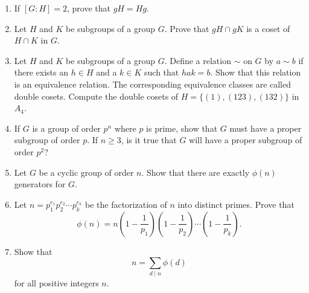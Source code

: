 {\begin{enumerate}
\item
If $[G : H] = 2$, prove that $gH = Hg$.

\item
Let $H$ and $K$ be subgroups of a group $G$.  Prove that $gH \cap gK$ is a coset of $H \cap K$ in $G$.  
 
\item
Let $H$ and $K$ be subgroups of a group $G$.  Define a relation $\sim$ on $G$ by $a \sim b$ if there exists an $h \in H$ and a $k \in K$ such that $hak = b$.  Show that this relation is an equivalence relation.  The corresponding equivalence classes are called {\bfi double cosets}.  Compute the double cosets of $H = \{ (1),(123), (132) \}$ in~$A_4$. 
 
\item
If $G$ is a group of order $p^n$ where $p$ is prime, show that $G$ must have a proper subgroup of order $p$.  If $n \geq 3$, is it true that $G$ will have a proper subgroup of order $p^2$?
 
\item
Let $G$ be a cyclic group of order $n$.  Show that there are exactly $\phi(n)$ generators for $G$.

\item
Let $n = p_1^{e_1} p_2^{e_2} \cdots p_k^{e_k}$ be the factorization of $n$ into distinct primes.  Prove that
$$
\phi(n) =  n 
\left( 1- \frac{1}{p_1} \right)
\left( 1- \frac{1}{p_2} \right)	\cdots
\left( 1- \frac{1}{p_k} \right).
$$

\item
Show that 
$$
n = \sum_{d \mid n} \phi(d)
$$
for all positive integers $n$.

\end{enumerate}
}



